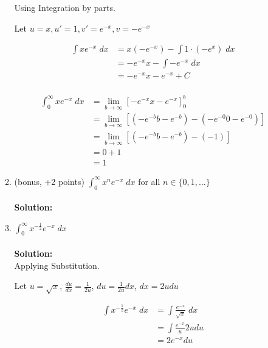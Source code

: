 \documentclass[a4paper]{article}
\begin{document}
\begin{enumerate}
\begin{enumerate}
Using Integration by parts.

Let $u = x, u' = 1, v' = e^{-x}, v = -e^{-x}$

\begin{align*}
\int xe^{-x} \; dx &= x(-e^{-x}) - \int 1 \cdot (-e^{x}) \; dx\\
&= -e^{-x}x - \int -e^{-x} \; dx\\
&= -e^{-x}x - e^{-x} + C\\
\end{align*}	



\begin{align*}
\int_0^\infty xe^{-x} \; dx &= \lim_{b \to \infty}\left[ -e^{-x}x - e^{-x} \right]_0^b\\
&= \lim_{b \to \infty}\left[ (-e^{-b}b - e^{-b})-(-e^{-0}0 - e^{-0}) \right]\\
&= \lim_{b \to \infty}\left[ (-e^{-b}b - e^{-b})-(-1) \right]\\
&= 0 + 1\\
&= 1
\end{align*}

	
	
	\item (bonus, +2 points) $\int_0^\infty x^ne^{-x} \; dx$ for all $n \in \{ 0,1,... \}$\\ \relax [Hint: Try first for n = 0,1,2,3]\\
	\textbf{Solution:}\\	
	
	
	
	\item $\int_0^\infty x^{-\frac{1}{2}}e^{-x} \; dx$\\ \relax
	[Hint: Substitute $u = \sqrt{x}$ and, at the end, some information from a previous exercise turns out to be useful.]\\
	\textbf{Solution:}\\	

Applying Substitution.

Let $u = \sqrt{x}$, $\frac{du}{dx} = \frac{1}{2u}$, $du = \frac{1}{2u}dx$, $dx = 2udu$

\begin{align*}
	\int x^{-\frac{1}{2}} e^{-x} \; dx &= \int \frac{e^{-x}}{\sqrt{x}} \; dx\\
	&= \int \frac{e^{-x}}{u} 2udu\\
	&= 2e^{-x}du
\end{align*}


\end{enumerate}
\end{enumerate}
\end{document}
